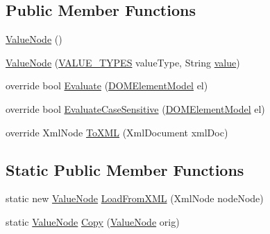 \subsection*{Public Member Functions}
\begin{DoxyCompactItemize}
\item 
\hyperlink{class_web_analyzer_1_1_models_1_1_settings_model_1_1_expression_tree_1_1_value_node_afafaa57c7b7f5cdc5447139118bd6d47}{Value\+Node} ()
\item 
\hyperlink{class_web_analyzer_1_1_models_1_1_settings_model_1_1_expression_tree_1_1_value_node_a62cfbb11d38c3f17e240cb2c5a1ac6f1}{Value\+Node} (\hyperlink{class_web_analyzer_1_1_models_1_1_settings_model_1_1_expression_tree_1_1_value_node_ac18254d82bd6e0d754ed1a2484882d11}{V\+A\+L\+U\+E\+\_\+\+T\+Y\+P\+E\+S} value\+Type, String \hyperlink{_u_i_2_h_t_m_l_resources_2js_2lib_2underscore_8min_8js_af7e1471ab89699458c4df8bb657298f6}{value})
\item 
override bool \hyperlink{class_web_analyzer_1_1_models_1_1_settings_model_1_1_expression_tree_1_1_value_node_a4372873a2359e8ef131624bad5bbaa58}{Evaluate} (\hyperlink{class_web_analyzer_1_1_models_1_1_data_model_1_1_d_o_m_element_model}{D\+O\+M\+Element\+Model} el)
\item 
override bool \hyperlink{class_web_analyzer_1_1_models_1_1_settings_model_1_1_expression_tree_1_1_value_node_a79986418c7a3439d1cb5d8f14ded199e}{Evaluate\+Case\+Sensitive} (\hyperlink{class_web_analyzer_1_1_models_1_1_data_model_1_1_d_o_m_element_model}{D\+O\+M\+Element\+Model} el)
\item 
override Xml\+Node \hyperlink{class_web_analyzer_1_1_models_1_1_settings_model_1_1_expression_tree_1_1_value_node_a801c7d0fdc559f12d8c8e6ae1943b59d}{To\+X\+M\+L} (Xml\+Document xml\+Doc)
\end{DoxyCompactItemize}
\subsection*{Static Public Member Functions}
\begin{DoxyCompactItemize}
\item 
static new \hyperlink{class_web_analyzer_1_1_models_1_1_settings_model_1_1_expression_tree_1_1_value_node}{Value\+Node} \hyperlink{class_web_analyzer_1_1_models_1_1_settings_model_1_1_expression_tree_1_1_value_node_adb68b0f5d8d1c99e3abca965f48a67d0}{Load\+From\+X\+M\+L} (Xml\+Node node\+Node)
\item 
static \hyperlink{class_web_analyzer_1_1_models_1_1_settings_model_1_1_expression_tree_1_1_value_node}{Value\+Node} \hyperlink{class_web_analyzer_1_1_models_1_1_settings_model_1_1_expression_tree_1_1_value_node_ab8b25f08e20250c49c14f7dfeda7a96f}{Copy} (\hyperlink{class_web_analyzer_1_1_models_1_1_settings_model_1_1_expression_tree_1_1_value_node}{Value\+Node} orig)
\end{DoxyCompactItemize}
